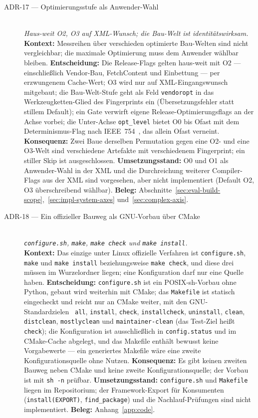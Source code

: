 \begin{description}
  \item[ADR-17 --- Optimierungsstufe als Anwender-Wahl]\hfill\\
  \emph{Haus-weit O2, O3 auf XML-Wunsch; die Bau-Welt ist identitätswirksam.}\hfill\\
  \textbf{Kontext:} Messreihen über verschieden optimierte Bau-Welten sind nicht vergleichbar;
  die maximale Optimierung muss dem Anwender wählbar bleiben.
  \textbf{Entscheidung:} Die Release-Flags gelten haus-weit mit O2 --- einschließlich Vendor-Bau,
  FetchContent und Einbettung --- per erzwungenem Cache-Wert; O3 wird nur auf XML-Eingangswunsch
  mitgebaut; die Bau-Welt-Stufe geht als Feld \texttt{vendoropt} in das Werkzeugketten-Glied des
  Fingerprints ein (Übersetzungsfehler statt stillem Default); ein Gate verwirft eigene
  Release-Optimierungsflags an der Achse vorbei; die Unter-Achse \texttt{opt\_level} bietet O0 bis
  Ofast mit dem Determinismus-Flag nach IEEE~754~\cite{ieee754_2019}, das allein Ofast verneint.
  \textbf{Konsequenz:} Zwei Baue derselben Permutation gegen eine O2- und eine O3-Welt sind
  verschiedene Artefakte mit verschiedenem Fingerprint; ein stiller Skip ist ausgeschlossen.
  \textbf{Umsetzungsstand:} O0 und O1 als Anwender-Wahl in der XML und die Durchreichung weiterer
  Compiler-Flags aus der XML sind vorgesehen, aber nicht implementiert (Default O2, O3
  überschreibend wählbar).
  \textbf{Beleg:} Abschnitte~\ref{sec:eval-build-scope},~\ref{sec:impl-system-axes}
  und~\ref{sec:complex-axis}.

  \item[ADR-18 --- Ein offizieller Bauweg als GNU-Vorbau über CMake]\hfill\\
  \emph{\texttt{configure.sh}, \texttt{make}, \texttt{make check} und \texttt{make install}.}\hfill\\
  \textbf{Kontext:} Das einzige unter Linux offizielle Verfahren ist \texttt{configure.sh},
  \texttt{make} und \texttt{make install} beziehungsweise \texttt{make check}, und diese drei müssen
  im Wurzelordner liegen; eine Konfiguration darf nur eine Quelle haben.
  \textbf{Entscheidung:} \texttt{configure.sh} ist ein POSIX-sh-Vorbau ohne Python, gebaut wird
  weiterhin mit CMake; das \texttt{Makefile} ist statisch eingecheckt und reicht nur an CMake weiter,
  mit den GNU-Standardzielen~\cite{gnu2026standards} \texttt{all}, \texttt{install}, \texttt{check},
  \texttt{installcheck}, \texttt{uninstall}, \texttt{clean}, \texttt{distclean},
  \texttt{mostlyclean} und \texttt{maintainer-clean} (das Test-Ziel heißt \texttt{check}); die
  Konfiguration ist ausschließlich in \texttt{config.status} und im CMake-Cache abgelegt, und das Makefile
  enthält bewusst keine Vorgabewerte --- ein generiertes Makefile wäre eine zweite Konfigurationsquelle ohne
  Nutzen.
  \textbf{Konsequenz:} Es gibt keinen zweiten Bauweg neben CMake und keine zweite
  Konfigurationsquelle; der Vorbau ist mit \texttt{sh -n} prüfbar.
  \textbf{Umsetzungsstand:} \texttt{configure.sh} und \texttt{Makefile} liegen im Repositorium; der
  Framework-Export für Konsumenten (\texttt{install(EXPORT)}, \texttt{find\_package}) und die
  Nachlauf-Prüfungen sind nicht implementiert.
  \textbf{Beleg:} Anhang~\ref{app:code}.


\end{description}
